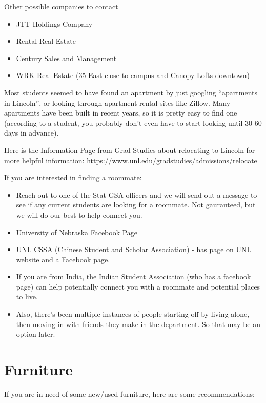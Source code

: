 \documentclass[
  12pt,
]{book}
\providecommand{\tightlist}{%
  \setlength{\itemsep}{0pt}\setlength{\parskip}{0pt}}
\begin{document}
Other possible companies to contact

\begin{itemize}
\tightlist
\item
  JTT Holdings Company
\item
  Rental Real Estate
\item
  Century Sales and Management
\item
  WRK Real Estate (35 East close to campus and Canopy Lofts downtown)
\end{itemize}

Most students seemed to have found an apartment by just googling ``apartments in Lincoln'', or looking through apartment rental sites like Zillow. Many apartments have been built in recent years, so it is pretty easy to find one (according to a student, you probably don't even have to start looking until 30-60 days in advance).

Here is the Information Page from Grad Studies about relocating to Lincoln for more helpful information: \url{https://www.unl.edu/gradstudies/admissions/relocate}

If you are interested in finding a roommate:

\begin{itemize}
\tightlist
\item
  Reach out to one of the Stat GSA officers and we will send out a message to see if any current students are looking for a roommate. Not gauranteed, but we will do our best to help connect you.
\item
  University of Nebraska Facebook Page
\item
  UNL CSSA (Chinese Student and Scholar Association) - has page on UNL website and a Facebook page.
\item
  If you are from India, the Indian Student Association (who has a facebook page) can help potentially connect you with a roommate and potential places to live.
\item
  Also, there's been multiple instances of people starting off by living alone, then moving in with friends they make in the department. So that may be an option later.
\end{itemize}

\hypertarget{furniture}{%
\section{Furniture}\label{furniture}}

If you are in need of some new/used furniture, here are some recommendations:
\end{document}
